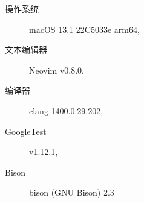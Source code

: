 \begin{description}
	\item[操作系统] macOS 13.1 22C5033e arm64,
	\item[文本编辑器] Neovim v0.8.0,
	\item[编译器] clang-1400.0.29.202,
	\item [GoogleTest] v1.12.1,
	\item [Bison] bison (GNU Bison) 2.3
\end{description}
